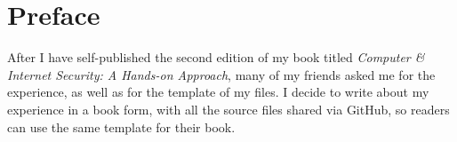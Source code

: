 


\chapter*{Preface}


\vspace{0.5in}
\noindent
After I have self-published the second edition of my book titled
\textit{Computer \& Internet Security: A Hands-on Approach}, 
many of my friends asked me for the experience, as well as for 
the template of my files. I decide to write about my experience in 
a book form, with all the source files shared via GitHub, so 
readers can use the same template for their book. 


